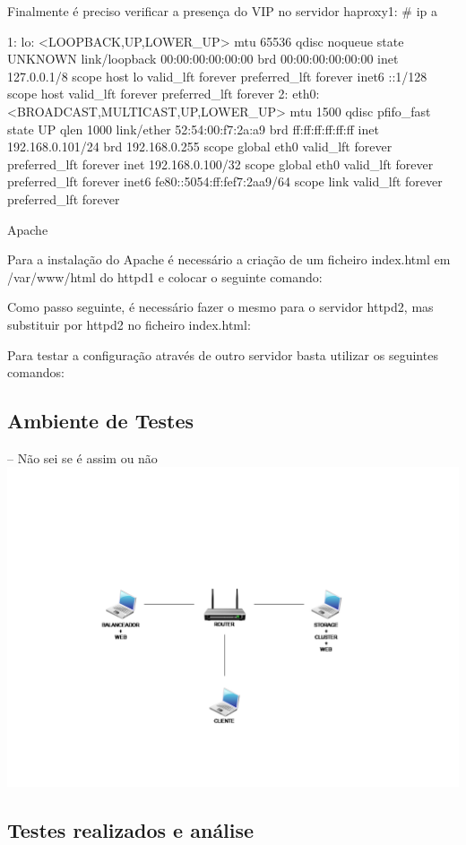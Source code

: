 Finalmente é preciso verificar a presença do VIP no servidor haproxy1:
# ip a

1: lo: <LOOPBACK,UP,LOWER_UP> mtu 65536 qdisc noqueue state UNKNOWN
link/loopback 00:00:00:00:00:00 brd 00:00:00:00:00:00
inet 127.0.0.1/8 scope host lo
valid_lft forever preferred_lft forever
inet6 ::1/128 scope host
valid_lft forever preferred_lft forever
2: eth0: <BROADCAST,MULTICAST,UP,LOWER_UP> mtu 1500 qdisc pfifo_fast state UP qlen 1000
link/ether 52:54:00:f7:2a:a9 brd ff:ff:ff:ff:ff:ff
inet 192.168.0.101/24 brd 192.168.0.255 scope global eth0
valid_lft forever preferred_lft forever
inet 192.168.0.100/32 scope global eth0
valid_lft forever preferred_lft forever
inet6 fe80::5054:ff:fef7:2aa9/64 scope link
valid_lft forever preferred_lft forever

Apache

Para a instalação do Apache é necessário a criação de um ficheiro index.html em /var/www/html do httpd1 e colocar o seguinte comando:
 \par

Como passo seguinte, é necessário fazer o mesmo para o servidor httpd2, mas substituir por httpd2 no ficheiro index.html:
 \par

Para testar a configuração através de outro servidor basta utilizar os seguintes comandos:
 \par
{} \par

\subsection{Ambiente de Testes}

-- Não sei se é assim ou não
\includegraphics[scale=.4]{img/AmbienteDeTestes}

\subsection{Testes realizados e análise}

